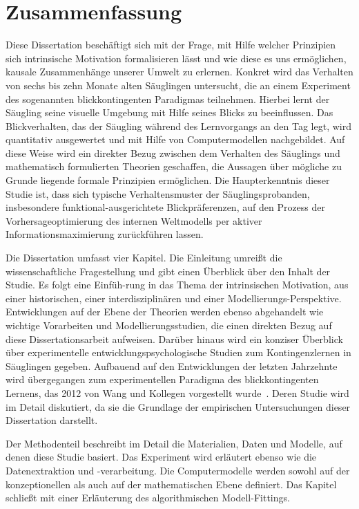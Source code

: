 \documentclass[a4paper]{scrreprt}
\begin{document}
\tableofcontents

\chapter*{Zusammenfassung}

Diese Dissertation besch\"aftigt sich mit der Frage, mit Hilfe welcher Prinzipien sich intrinsische Motivation formalisieren l\"asst und wie diese es uns erm\"oglichen, kausale Zusammenh\"ange unserer Umwelt zu erlernen. Konkret wird das Verhalten von sechs bis zehn Monate alten S\"auglingen untersucht, die an einem Experiment des sogenannten blickkontingenten Paradigmas teilnehmen. Hierbei lernt der S\"augling seine visuelle Umgebung mit Hilfe seines Blicks zu beeinflussen. Das Blickverhalten, das der S\"augling w\"ahrend des Lernvorgangs an den Tag legt, wird quantitativ ausgewertet und mit Hilfe von Computermodellen nachgebildet. Auf diese Weise wird ein direkter Bezug zwischen dem Verhalten des S\"auglings und mathematisch formulierten Theorien geschaffen, die Aussagen \"uber m\"ogliche zu Grunde liegende formale Prinzipien erm\"oglichen. Die Haupterkenntnis dieser Studie ist, dass sich typische Verhaltensmuster der S\"auglingsprobanden, insbesondere funktional-ausgerichtete Blickpr\"aferenzen, auf den Prozess der Vorhersageoptimierung des internen Weltmodells per aktiver Informationsmaximierung zur\"uckf\"uhren lassen.

Die Dissertation umfasst vier Kapitel. Die Einleitung umrei\ss t die wissenschaftliche Fragestellung und gibt einen \"Uberblick \"uber den Inhalt der Studie. Es folgt eine Einf\"uh-rung in das Thema der intrinsischen Motivation, aus einer historischen, einer interdisziplin\"aren und einer Modellierungs-Perspektive. Entwicklungen auf der Ebene der Theorien werden ebenso abgehandelt wie wichtige Vorarbeiten und Modellierungsstudien, die einen direkten Bezug auf diese Dissertationsarbeit aufweisen. Dar\"uber hinaus wird ein konziser \"Uberblick \"uber experimentelle entwicklungspsychologische Studien zum Kontingenzlernen in S\"auglingen gegeben. Aufbauend auf den Entwicklungen der letzten Jahrzehnte wird \"ubergegangen zum experimentellen Paradigma des blickkontingenten Lernens, das 2012 von Wang und Kollegen vorgestellt wurde~\cite{wang12}. Deren Studie wird im Detail diskutiert, da sie die Grundlage der empirischen Untersuchungen dieser Dissertation darstellt.

Der Methodenteil beschreibt im Detail die Materialien, Daten und Modelle, auf denen diese Studie basiert. Das Experiment wird erl\"autert ebenso wie die Datenextraktion und -verarbeitung. Die Computermodelle werden sowohl auf der konzeptionellen als auch auf der mathematischen Ebene definiert. Das Kapitel schlie\ss t mit einer Erl\"auterung des algorithmischen Modell-Fittings.
\end{document}
